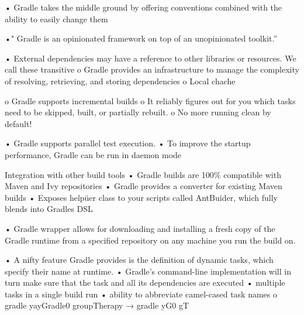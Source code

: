 	•	Gradle takes the middle ground by offering conventions combined with the ability to easily change them
	
	•"	Gradle is an opinionated framework on top of an unopinionated toolkit.”
	
	
	
	
	•	External dependencies may have a reference to other libraries or resources. We call these transitive 
	o	Gradle provides an infrastructure to manage the complexity of resolving, retrieving, and storing dependencies
	o	Local chache
	
	
	o	Gradle supports incremental builds
	o	It reliably figures out for you which tasks need to be skipped, built, or partially rebuilt.
	o	No more running clean by default!
	
	•	Gradle supports parallel test execution.
	•	To improve the startup performance, Gradle can be run in daemon mode
	
	Integration with other build tools
	•	Gradle builds are 100\% compatible with Maven and Ivy repositories
	•	Gradle provides a converter for existing Maven builds
	•	Exposes helpüer class to your scripts called AntBuider, which fully blends into Gradles DSL
	
	•	Gradle wrapper allows for downloading and installing a fresh copy of the Gradle runtime from a specified repository on any machine you run the build on.
	
	
	•	A nifty feature Gradle provides is the definition of dynamic tasks, which specify their name at runtime.
	•	Gradle’s command-line implementation will in turn make sure that the task and all its dependencies are executed
	•	multiple tasks in a single build run
	•	ability to abbreviate camel-cased task names
	o	gradle yayGradle0 groupTherapy → gradle yG0 gT
	